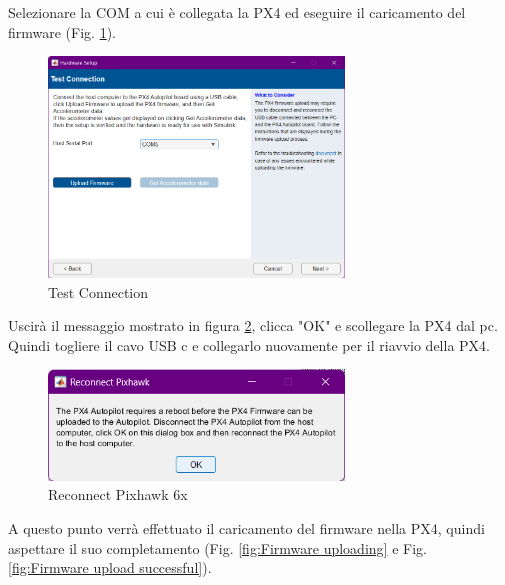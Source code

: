 \noindent
Selezionare la COM a cui è collegata la PX4 ed eseguire il caricamento del firmware (Fig. \ref{fig:Test Connection}).
\begin{figure}[H] %
  \centering
  \includegraphics[width=0.7\textwidth]{files/images/matlab16.png} %
  \caption{Test Connection} %
  \label{fig:Test Connection} %
\end{figure}
\noindent
Uscirà il messaggio mostrato in figura \ref{fig:Reconnect Pixhawk 6x}, clicca "OK" e scollegare la PX4 dal pc. Quindi togliere il cavo USB c e collegarlo nuovamente per il riavvio della PX4.
\begin{figure}[H] %
  \centering
  \includegraphics[width=0.7\textwidth]{files/images/matlab17.png} %
  \caption{Reconnect Pixhawk 6x} %
  \label{fig:Reconnect Pixhawk 6x} %
\end{figure}
\noindent
A questo punto verrà effettuato il caricamento del firmware nella PX4, quindi aspettare il suo completamento (Fig. \ref{fig:Firmware uploading} e Fig. \ref{fig:Firmware upload successful}).



